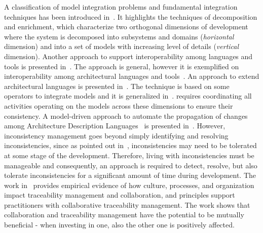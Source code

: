 A classification of model integration problems and fundamental integration
techniques has  been introduced in~\cite{GieseNNS2011}. It highlights  the
techniques of decomposition and enrichment, which characterize two orthogonal
dimensions of development where the system is decomposed into subsystems and
domains (\emph{horizontal} dimension) and into a set of models with increasing
level of details (\emph{vertical} dimension). %
Another approach to support interoperability among languages and tools is presented in~\cite{dually}. The approach is general, however it is exemplified on interoperability among architectural languages and tools~\cite{TSE2013}. An approach to extend architectural languages is presented in~\cite{byADL}. The technique is based on some operators to integrate models and it is generalized in~\cite{FASE2012}. %
 requires coordinating all
activities operating on the models across these dimensions to ensure their
consistency. %
A model-driven approach to automate the propagation of changes among Architecture Description Languages~\cite{TSE2013} is presented in~\cite{Eramo2012}. %
However, inconsistency management goes beyond simply identifying
and resolving inconsistencies, since as pointed out in~\cite{Finkelstein+1994},
inconsistencies may need to be  tolerated at some stage of the development.
Therefore, living with inconsistencies must be manageable and consequently, an
approach is required to detect, resolve, but also tolerate inconsistencies for a
significant amount of time during development. %
The work in~\cite{Wohlrab2018} provides empirical evidence of how culture, processes, and organization impact traceability management and collaboration, and principles support practitioners with collaborative traceability management. The work shows that collaboration and traceability management have the potential to be mutually beneficial - when investing in one, also the other one is positively affected. %

